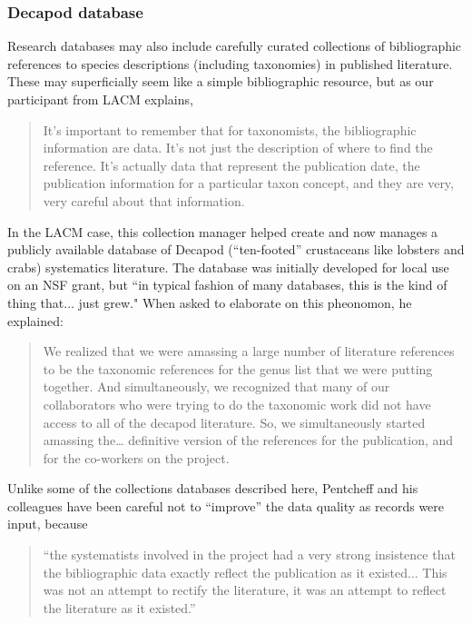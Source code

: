 \subsubsection{Decapod database}
Research databases may also include carefully curated collections of bibliographic references to species descriptions (including taxonomies) in published literature. These may superficially seem like a simple bibliographic resource, but as our participant from LACM explains,
\begin{quote}
It’s important to remember that for taxonomists, the bibliographic information are data. It's not just the description of where to find the reference. It's actually data that represent the publication date, the publication information for a particular taxon concept, and they are very, very careful about that information.
\end{quote}
In the LACM case, this collection manager helped create and now manages a publicly available database of Decapod (“ten-footed” crustaceans like lobsters and crabs) systematics literature. The database was initially developed for local use on an NSF grant, but “in typical fashion of many databases, this is the kind of thing that... just grew." When asked to elaborate on this pheonomon, he explained:
\begin{quote}
We realized that we were amassing a large number of literature references to be the taxonomic references for the genus list that we were putting together. And simultaneously, we recognized that many of our collaborators who were trying to do the taxonomic work did not have access to all of the decapod literature. So, we simultaneously started amassing the… definitive version of the references for the publication, and for the co-workers on the project.
\end{quote}
Unlike some of the collections databases described here, Pentcheff and his colleagues have been careful not to “improve” the data quality as records were input, because \begin{quote}“the systematists involved in the project had a very strong insistence that the bibliographic data exactly reflect the publication as it existed... This was not an attempt to rectify the literature, it was an attempt to reflect the literature as it existed.”\end{quote} 

